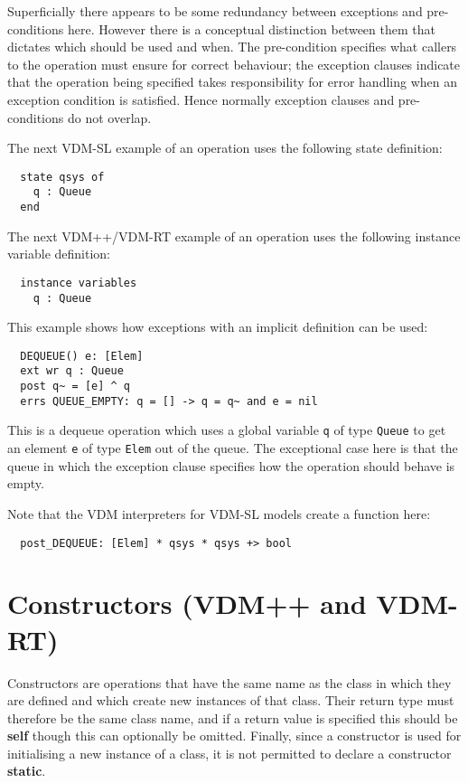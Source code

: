 \documentclass{overturerepchap}
\newcommand{\keyw}[1]{{\bf\ttfamily #1}}
\begin{document}
{\begin{description}
Superficially there appears to be some redundancy between exceptions
and pre-conditions here. However there is a conceptual distinction
between them that dictates which should be used and when. The
pre-condition specifies what callers  to the operation must ensure for
correct behaviour; the exception clauses indicate that the operation
being specified takes responsibility for error handling when an
exception condition is satisfied. Hence normally exception clauses and
pre-conditions do not overlap.

The next VDM-SL example of an operation uses the following state definition:
\begin{lstlisting}
  state qsys of
    q : Queue
  end
\end{lstlisting}

The next VDM++/VDM-RT example of an operation uses the following
instance variable definition:
\begin{lstlisting}
  instance variables
    q : Queue
\end{lstlisting}

This example shows how exceptions with an implicit definition can be used:
\begin{lstlisting}
  DEQUEUE() e: [Elem]
  ext wr q : Queue
  post q~ = [e] ^ q
  errs QUEUE_EMPTY: q = [] -> q = q~ and e = nil
\end{lstlisting}

This is a dequeue operation which uses a global variable {\tt q} of
type {\tt Queue} to get an element {\tt e} of type {\tt Elem} out of
the queue. The exceptional case here is that the queue in
which the exception clause specifies how the operation should
behave is empty.

Note that the VDM interpreters for VDM-SL models create a function here:
\begin{lstlisting}
  post_DEQUEUE: [Elem] * qsys * qsys +> bool
\end{lstlisting}

\end{description}


\section{Constructors (VDM++ and VDM-RT)}\label{constructors}

Constructors are operations that have the same name as the class in
which they are defined and which create new instances of that
class. Their return type must therefore be the same class
name, and if a return value is specified this should be \keyw{self}
though this can optionally be omitted. Finally, since a constructor is used for initialising a new instance of a class, it is not permitted to declare a constructor \keyw{static}.

}
\end{document}

